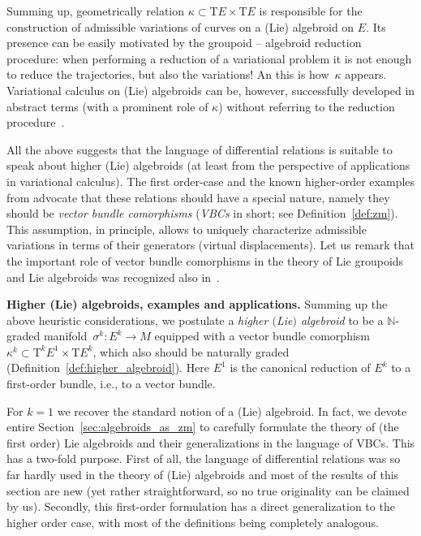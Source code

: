 \documentclass[pdftex]{sigma}
\newcommand{\grB}{{$\N$-graded manifold}}
\newcommand{\ZM}{{VBC}} %
\newcommand{\Zakrzewski}{{vector bundle comorphism}}
\newcommand{\N}{\mathbb{N}}
\newcommand{\ra}{\rightarrow}
\newcommand{\T}{\mathrm{T}} %
\newcommand{\TT}[1]{\mathrm{T}^{#1}} %
\numberwithin{equation}{section}
\theoremstyle{definition}
\begin{document}
Summing up, geometrically relation $\kappa\subset\T E\times\T E$ is responsible for the construction of admissible variations of curves on a (Lie) algebroid on $E$. Its presence can be easily motivated by the groupoid -- algebroid reduction procedure: when performing a reduction of a variational problem it is not enough to reduce the trajectories, but also the variations! An this is how~$\kappa$ appears. Variational calculus on (Lie) algebroids can be, however, successfully developed in abstract terms (with a prominent role of $\kappa$) without referring to the reduction procedure~\cite{GG_var_calc_gen_alg_2008}.

All the above suggests that the language of differential relations is suitable to speak about higher (Lie) algebroids (at least from the perspective of applications in variational calculus). The first order-case \cite{GG_var_calc_gen_alg_2008} and the known higher-order examples from \cite{MJ_MR_prototypes} advocate that these relations should have a special nature, namely they should be \emph{\Zakrzewski s} (\emph{\ZM s} in short; see Definition~\ref{def:zm}). This assumption, in principle, allows to uniquely characterize admissible variations in terms of their generators (virtual displacements). Let us remark that the important role of \Zakrzewski s in the theory of Lie groupoids and Lie algebroids was recognized also in~\cite{Cattaneo_Dherin_Weinstein_2012}.

{\bf Higher (Lie) algebroids, examples and applications.} Summing up the above heuristic considerations, we postulate a \emph{higher $($Lie$)$ algebroid} to be a \grB\ $\sigma^k\colon E^k\ra M$ equipped with a \Zakrzewski\ $\kappa^k\subset\TT{k} E^1\times \T E^k$, which also should be naturally graded (Definition~\ref{def:higher_algebroid}). Here $E^1$ is the canonical reduction of $E^k$ to a first-order bundle, i.e., to a vector bundle.

For $k=1$ we recover the standard notion of a (Lie) algebroid. In fact, we devote entire Section~\ref{sec:algebroids_as_zm} to carefully formulate the theory of (the first order) Lie algebroids and their generalizations in the language of \ZM s. This has a two-fold purpose. First of all, the language of differential relations was so far hardly used in the theory of (Lie) algebroids and most of the results of this section are new (yet rather straightforward, so no true originality can be claimed by us). Secondly, this first-order formulation has a direct generalization to the higher order case, with most of the definitions being completely analogous.
\end{document}
